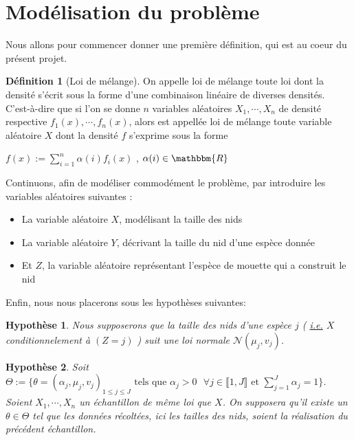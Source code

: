 \documentclass[frenchb]{report}
\newcommand{\R}{\mathbbm{R}}
\newcommand{\1}{\mathbbm{1}}
\newcommand{\n}{\mathcal{N}}
\newtheorem{hyp}{Hypothèse}
\theoremstyle{definition}\newtheorem{defn}{Définition}
\theoremstyle{definition}\newtheorem{exm}{Exemple}
\theoremstyle{definition}\newtheorem{nota}{Notation}
\theoremstyle{definition}\newtheorem{rem}{Remarque}
\begin{document}
\section{Modélisation du problème}

Nous allons pour commencer donner une première définition, qui est au coeur du présent projet.

\begin{defn}[Loi de mélange]
On appelle loi de mélange toute loi dont la densité s'écrit sous la forme d'une combinaison linéaire de diverses densités. C'est-à-dire que si l'on se donne $n$ variables aléatoires $X_1, \cdots, X_n$ de densité respective $f_1(x), \cdots, f_n(x)$, alors est appellée loi de mélange toute variable aléatoire $X$ dont la densité $f$ s'exprime sous la forme
\begin{center} $f(x) := \displaystyle\sum_{i=1}^n \alpha(i) f_i(x)$ , $\alpha(i) \in\R$ \end{center}

\end{defn}

Continuons, afin de modéliser commodément le problème, par introduire les variables aléatoires suivantes :

\begin{itemize}[label=\adfflowerleft]
	\item La variable aléatoire $X$, modélisant la taille des nids
	\item La variable aléatoire $Y$, décrivant la taille du nid d'une espèce donnée
	\item Et $Z$, la variable aléatoire représentant l'espèce de mouette qui a construit le nid
\end{itemize}

Enfin, nous nous placerons sous les hypothèses suivantes:

\begin{hyp}
Nous supposerons que la taille des nids d'une espèce $j$ ( \underline{i.e.} $X$ conditionnelement à $(Z=j)$ ) suit une loi normale $\n(\mu_j,v_j)$. 
\end{hyp}


\begin{hyp}
Soit $\Theta := \{ \theta = (\alpha_j,\mu_j, v_j)_{1 \leq j \leq J} \text{ tels que } \alpha_j > 0 \text{ } \forall j\in \llbracket 1,J\rrbracket \text{ et } \displaystyle\sum_{j=1}^J\alpha_j=1\}$. Soient $X_1, \cdots, X_n$ un échantillon de même loi que $X$. On supposera qu'il existe un $\theta \in \Theta$ tel que les données récoltées, ici les tailles des nids, soient la réalisation du précédent échantillon.
\end{hyp}
\end{document}
